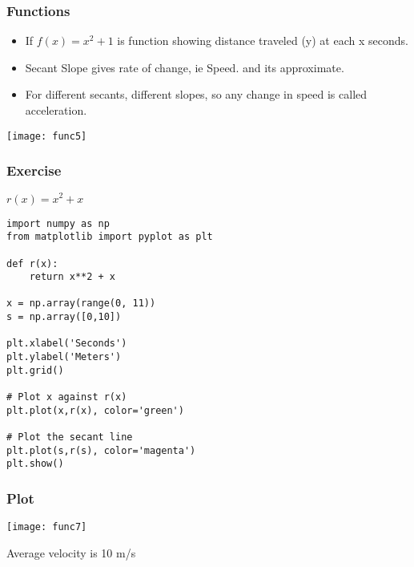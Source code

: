  \begin{frame}[fragile]\frametitle{Functions}
\begin{itemize}
\item If $f(x) = x^2 + 1$ is function showing distance traveled (y) at each x seconds.
\item Secant Slope gives rate of change, ie Speed. and its approximate.
\item For different secants, different slopes, so any change in speed is called acceleration.
\end{itemize}
\begin{center}
\texttt{[image: func5]}
\end{center}
\end{frame}


 \begin{frame}[fragile]\frametitle{Exercise}
$r(x) = x^2 + x$

\begin{lstlisting}
import numpy as np
from matplotlib import pyplot as plt

def r(x):
    return x**2 + x

x = np.array(range(0, 11))
s = np.array([0,10])

plt.xlabel('Seconds')
plt.ylabel('Meters')
plt.grid()

# Plot x against r(x)
plt.plot(x,r(x), color='green')

# Plot the secant line
plt.plot(s,r(s), color='magenta')
plt.show()
\end{lstlisting}
\end{frame}


 \begin{frame}[fragile]\frametitle{Plot}
\begin{center}
\texttt{[image: func7]}
\end{center}
Average velocity is 10 m/s
\end{frame}

